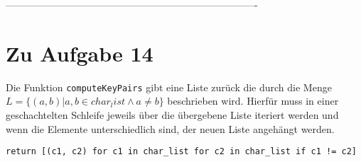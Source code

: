 \documentclass[12pt]{article}
\begin{document}
 
%
 ----------------------------------------------------------------------------
\section{Zu Aufgabe 14}

Die Funktion \texttt{computeKeyPairs} gibt eine Liste zurück die durch die Menge $L =\{(a,b) \vert a, b \in char_list \land a \neq b\}$ beschrieben wird. Hierfür muss in einer geschachtelten Schleife jeweils über die übergebene Liste iteriert werden und wenn die Elemente unterschiedlich sind, der neuen Liste angehängt werden.

\begin{lstlisting}
return [(c1, c2) for c1 in char_list for c2 in char_list if c1 != c2]
\end{lstlisting}
\end{document}
